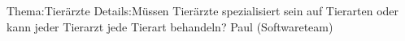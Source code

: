 
%
	{Thema:}{Tierärzte}%
	{Details:}{Müssen Tierärzte spezialisiert sein auf Tierarten oder kann jeder Tierarzt jede Tierart behandeln?}%
	{Paul (Softwareteam)}

